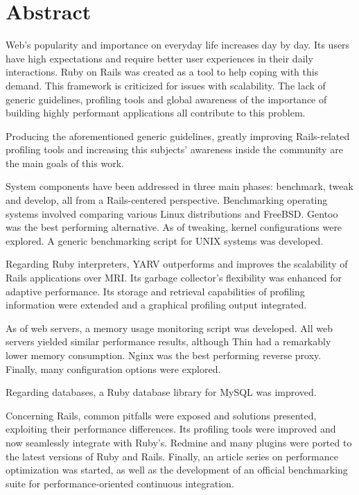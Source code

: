 
\chapter*{Abstract}

Web's popularity and importance on everyday life increases day by day. Its users have high expectations and require better user experiences in their daily interactions. Ruby on Rails was created as a tool to help coping with this demand. This framework is criticized for issues with scalability. The lack of generic guidelines, profiling tools and global awareness of the importance of building highly performant applications all contribute to this problem.

Producing the aforementioned generic guidelines, greatly improving Rails-related profiling tools and increasing this subjects' awareness inside the community are the main goals of this work.

System components have been addressed in three main phases: benchmark, tweak and develop, all from a Rails-centered perspective. Benchmarking operating systems involved comparing various Linux distributions and FreeBSD. Gentoo was the best performing alternative. As of tweaking, kernel configurations were explored. A generic benchmarking script for UNIX systems was developed.

Regarding Ruby interpreters, YARV outperforms and improves the scalability of Rails applications over MRI. Its garbage collector's flexibility was enhanced for adaptive performance. Its storage and retrieval capabilities of profiling information were extended and a graphical profiling output integrated. 

As of web servers, a memory usage monitoring script was developed. All web servers yielded similar performance results, although Thin had a remarkably lower memory consumption. Nginx was the best performing reverse proxy. Finally, many configuration options were explored. 

Regarding databases, a Ruby database library for MySQL was improved.

Concerning Rails, common pitfalls were exposed and solutions presented, exploiting their performance differences. Its profiling tools were improved and now seamlessly integrate with Ruby's. Redmine and many plugins were ported to the latest versions of Ruby and Rails. Finally, an article series on performance optimization was started, as well as the development of an official benchmarking suite for performance-oriented continuous integration.

